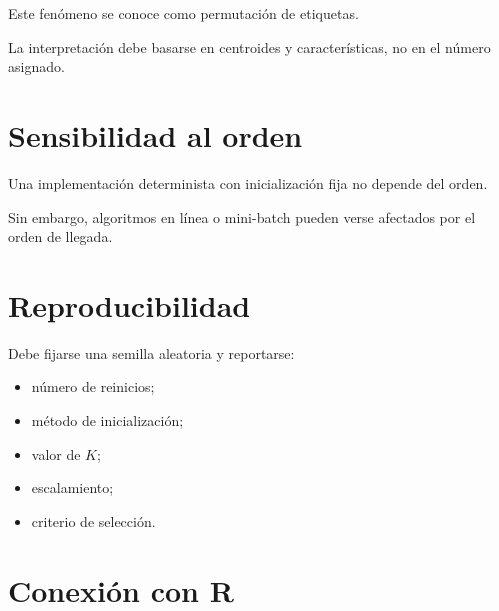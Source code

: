 \documentclass[
  spanish,
  10.5pt,
  letterpaper,
  DIV=11,
  numbers=noendperiod,
  oneside,
  open=any]{scrreprt}
\providecommand{\tightlist}{%
  \setlength{\itemsep}{0pt}\setlength{\parskip}{0pt}}
\theoremstyle{definition}
\theoremstyle{definition}
\theoremstyle{plain}
\theoremstyle{remark}
\begin{document}

Este fenómeno se conoce como permutación de etiquetas.

La interpretación debe basarse en centroides y características, no en el
número asignado.

\section*{Sensibilidad al orden}\label{sensibilidad-al-orden}


Una implementación determinista con inicialización fija no depende del
orden.

Sin embargo, algoritmos en línea o mini-batch pueden verse afectados por
el orden de llegada.

\section*{Reproducibilidad}\label{reproducibilidad-1}


Debe fijarse una semilla aleatoria y reportarse:

\begin{itemize}
\tightlist
\item
  número de reinicios;
\item
  método de inicialización;
\item
  valor de \(K\);
\item
  escalamiento;
\item
  criterio de selección.
\end{itemize}

\section*{Conexión con R}\label{conexiuxf3n-con-r-16}

\end{document}
